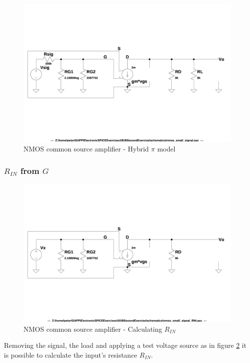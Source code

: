 \documentclass[10pt,a4paper]{book}
\begin{document}
\begin{figure}[h]
  \centering
  \includegraphics[width=12cm]{schematics/nmos_small_signal.jpg}
  \caption{NMOS common source amplifier - Hybrid $\pi$ model}
  \label{nmos_pi}
\end{figure}

\subsubsection{$R_{IN}$ from $G$}\label{RIN}

\begin{figure}[h]
  \centering
  \includegraphics[width=12cm]{schematics/nmos_small_signal_RIN.jpg}
  \caption{NMOS common source amplifier - Calculating $R_{IN}$}
  \label{nmos_pi_RIN}
\end{figure}

Removing the signal, the load and applying a test voltage source as in figure \ref{nmos_pi_RIN} it is possible to calculate the input's resistance $R_{IN}$.\\
\end{document}
